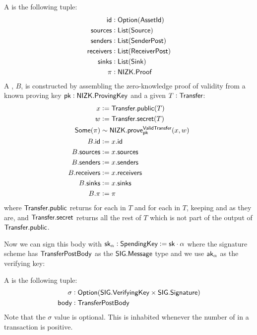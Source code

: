 \begin{definition}
    A \TransferPostBody{} is the following tuple:
    \begin{align*}
        {\textsf{id}}        &: {\textsf{Option}}({\textsf{AssetId}}) \\
        {\textsf{sources}}   &: {\textsf{List}}({\textsf{Source}}) \\
        {\textsf{senders}}   &: {\textsf{List}}({\textsf{SenderPost}}) \\
        {\textsf{receivers}} &: {\textsf{List}}({\textsf{ReceiverPost}}) \\
        {\textsf{sinks}}     &: {\textsf{List}}({\textsf{Sink}}) \\
        \pi        &: {\textsf{NIZK}}.{\textsf{Proof}} 
    \end{align*}
    A \TransferPostBody{}, $B$, is constructed by assembling the zero-knowledge proof of \Transfer{} validity from a known proving key ${\textsf{pk}} : {\textsf{NIZK}}.{\textsf{ProvingKey}}$ and a given $T : {\textsf{Transfer}}$:
   \begin{align*}
        x            &:= {\textsf{Transfer}}.{\textsf{public}}(T) \\
        w            &:= {\textsf{Transfer}}.{\textsf{secret}}(T) \\
        {\textsf{Some}}(\pi)   &\sim {\textsf{NIZK}}.{\textsf{prove}}^{\textsf{ValidTransfer}}_{\textsf{pk}}(x, w) \\
        B.{\textsf{id}}        &:= x.{\textsf{id}} \\
        B.{\textsf{sources}}   &:= x.{\textsf{sources}} \\
        B.{\textsf{senders}}   &:= x.{\textsf{senders}} \\
        B.{\textsf{receivers}} &:= x.{\textsf{receivers}} \\
        B.{\textsf{sinks}}     &:= x.{\textsf{sinks}} \\
        B.\pi        &:= \pi
    \end{align*}
    where ${\textsf{Transfer}}.{\textsf{public}}$ returns  for each \Sender{} in $T$ and  for each \Receiver{} in $T$, keeping  and  as they are, and ${\textsf{Transfer}}.{\textsf{secret}}$ returns all the rest of $T$ which is not part of the output of ${\textsf{Transfer}}.{\textsf{public}}$.
\end{definition}

Now we can sign this body with ${\textsf{sk}}_\alpha : {\textsf{SpendingKey}} := {\textsf{sk}} \cdot \alpha$ where the signature scheme has ${\textsf{TransferPostBody}}$ as the ${\textsf{SIG}}.{\textsf{Message}}$ type and we use ${\textsf{ak}}_\alpha$ as the verifying key:

\begin{definition}
    A \TransferPost{} is the following tuple:
    \begin{align*}
        \sigma &: {\textsf{Option}}({\textsf{SIG}}.{\textsf{VerifyingKey}} \times {\textsf{SIG}}.{\textsf{Signature}}) \\
        {\textsf{body}}  &: {\textsf{TransferPostBody}}
    \end{align*}
    Note that the $\sigma$ value is optional. This is inhabited whenever the number of  in a transaction is positive.
\end{definition}

